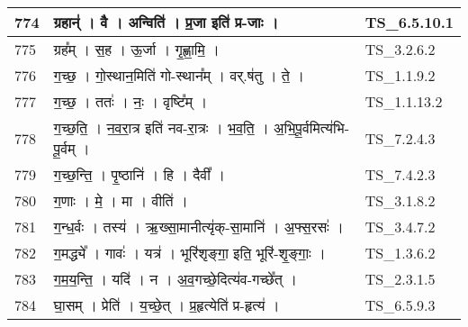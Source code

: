 \documentclass[17pt]{extarticle}
\begin{document}
\begin{longtable}{||p{0.4in}||p{4.9in}||p{0.9in}||}
    \hline
        
    774 & ग्रहान्॑   ।   वै   ।   अन्विति॑   ।   प्र॒जा इति॑ प्र{-}जाः   ।    & TS\_6.5.10.1       \\
    
    \hline
        
    775 & ग्रह᳚म्   ।   स॒ह   ।   ऊ॒र्जा   ।   गृ॒ह्णा॒मि॒   ।    & TS\_3.2.6.2       \\
    
    \hline
        
    776 & ग॒च्छ॒   ।   गो॒स्थान॒मिति॑ गो{-}स्थान᳚म्   ।   वर्.ष॑तु   ।   ते॒   ।    & TS\_1.1.9.2       \\
    
    \hline
        
    777 & ग॒च्छ॒   ।   ततः॑   ।   नः॒   ।   वृष्टि᳚म्   ।    & TS\_1.1.13.2       \\
    
    \hline
        
    778 & ग॒च्छ॒ति॒   ।   न॒व॒रा॒त्र इति॑ नव{-}रा॒त्रः   ।   भ॒व॒ति॒   ।   अ॒भि॒पू॒र्वमित्य॑भि{-}पू॒र्वम्   ।    & TS\_7.2.4.3       \\
    
    \hline
        
    779 & ग॒च्छ॒न्ति॒   ।   पृ॒ष्ठानि॑   ।   हि   ।   दैवी᳚   ।    & TS\_7.4.2.3       \\
    
    \hline
        
    780 & ग॒णाः   ।   मे॒   ।   मा   ।   वीति॑   ।    & TS\_3.1.8.2       \\
    
    \hline
        
    781 & ग॒न्ध॒र्वः   ।   तस्य॑   ।   ऋ॒ख्सा॒मानीत्यृ॑क्{-}सा॒मानि॑   ।   अ॒फ्स॒रसः॑   ।    & TS\_3.4.7.2       \\
    
    \hline
        
    782 & ग॒मद्ध्ये᳚   ।   गावः॑   ।   यत्र॑   ।   भूरि॑शृङ्गा॒ इति॒ भूरि॑{-}शृ॒ङ्गाः॒   ।    & TS\_1.3.6.2       \\
    
    \hline
        
    783 & ग॒म॒य॒न्ति॒   ।   यदि॑   ।   न   ।   अ॒व॒गच्छे॒दित्य॑व{-}गच्छे᳚त्   ।    & TS\_2.3.1.5       \\
    
    \hline
        
    784 & घा॒सम्   ।   प्रेति॑   ।   य॒च्छे॒त्   ।   प्र॒हृत्येति॑ प्र{-}हृत्य॑   ।    & TS\_6.5.9.3       \\
    

\end{longtable}
\end{document}
